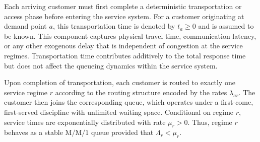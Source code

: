 \documentclass[letter,11pt, reqno]{amsart}
\begin{document}

Each arriving customer must first complete a deterministic transportation or
access phase before entering the service system. For a customer originating at
demand point $a$, this transportation time is denoted by $t_a\ge 0$ and is assumed to be
known. This component captures physical travel time, communication latency, or any
other exogenous delay that is independent of congestion at the service regimes.
Transportation time contributes additively to the total response time but does not
affect the queueing dynamics within the service system.

Upon completion of transportation, each customer is routed to exactly one service
regime $r$ according to the routing structure encoded by the rates
$\lambda_{ar}$. The customer then joins the corresponding queue, which operates
under a first-come, first-served discipline with unlimited waiting space. Conditional
on regime $r$, service times are exponentially distributed with rate $\mu_r>0$.
Thus, regime $r$ behaves as a stable $\mathrm{M}/\mathrm{M}/1$ queue provided that
$\Lambda_r < \mu_r$.
\end{document}
